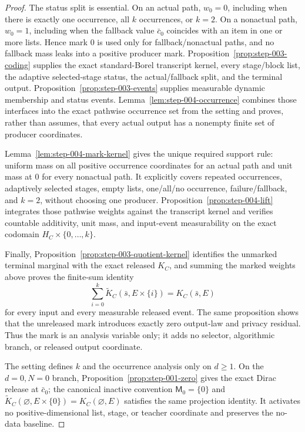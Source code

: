 \begin{proof}
The status split is essential. On an actual path, \(w_0=0\), including when
there is exactly one occurrence, all \(k\) occurrences, or \(k=2\). On a
nonactual path, \(w_0=1\), including when the fallback value \(\bar c_0\)
coincides with an item in one or more lists. Hence mark \(0\) is used only
for fallback/nonactual paths, and no fallback mass leaks into a positive
producer mark. 
Proposition~\ref{prop:step-003-coding} supplies the exact
standard-Borel transcript kernel, every stage/block list, the adaptive
selected-stage status, the actual/fallback split, and the terminal output.
Proposition~\ref{prop:step-003-events} supplies measurable dynamic
membership and status events. Lemma~\ref{lem:step-004-occurrence} combines
those  interfaces into the exact pathwise occurrence set from the
setting and proves, rather than assumes, that every actual output has a
nonempty finite set of producer coordinates.

Lemma~\ref{lem:step-004-mark-kernel} gives the unique required support rule:
uniform mass on all positive occurrence coordinates for an actual path and
unit mass at \(0\) for every nonactual path. It explicitly covers repeated
occurrences, adaptively selected stages, empty lists, one/all/no occurrence,
failure/fallback, and \(k=2\), without choosing one producer.
Proposition~\ref{prop:step-004-lift} integrates those pathwise weights
against the  transcript kernel and verifies countable additivity,
unit mass, and input-event measurability on the exact codomain
\(H_C\times\{0,\ldots,k\}\).

Finally, Proposition~\ref{prop:step-003-quotient-kernel} identifies
the unmarked terminal marginal with the exact released \(K_C\), and
summing the marked weights above proves the finite-sum identity
\[
\sum_{i=0}^k
\widetilde K_C(\bar s,E\times\{i\})=K_C(\bar s,E)
\]
for every input and every measurable released event. The same proposition
shows that the unreleased mark introduces exactly zero output-law and
privacy residual. Thus the mark is an analysis variable only; it adds no
selector, algorithmic branch, or released output coordinate.

The setting defines \(k\) and the occurrence analysis only on \(d\geq1\).
On the \(d=0,N=0\) branch, Proposition~\ref{prop:step-001-zero} gives the exact Dirac
release at \(\bar c_0\); the canonical inactive convention
\(\mathsf M_0=\{0\}\) and
\(\widetilde K_C(\varnothing,E\times\{0\})=K_C(\varnothing,E)\) satisfies
the same projection identity. It activates no positive-dimensional list,
stage, or teacher coordinate and preserves the no-data baseline.



\end{proof}


